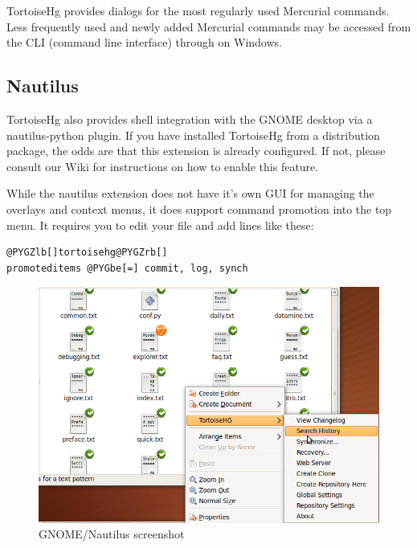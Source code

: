 \documentclass[letterpaper,10pt,english]{manual}
\begin{document}
TortoiseHg provides dialogs for the most regularly used Mercurial
commands.  Less frequently used and newly added Mercurial commands
may be accessed from the CLI (command line interface) through
 on Windows.


\subsection{Nautilus}

TortoiseHg also provides shell integration with the GNOME desktop via a
nautilus-python plugin.  If you have installed TortoiseHg from a
distribution package, the odds are that this extension is already
configured.  If not, please consult our Wiki for instructions on how to
enable this feature.

While the nautilus extension does not have it's own GUI for managing the
overlays and context menus, it does support command promotion into the
top menu.  It requires you to edit your  file and add
lines like these:

\begin{Verbatim}[commandchars=@\[\]]
@PYGZlb[]tortoisehg@PYGZrb[]
promoteditems @PYGbe[=] commit, log, synch
\end{Verbatim}
\begin{figure}[htbp]
\centering

\includegraphics{nautilus.png}
\caption{GNOME/Nautilus screenshot}\end{figure}

\resetcurrentobjects
\hypertarget{--doc-init}{}
\end{document}
